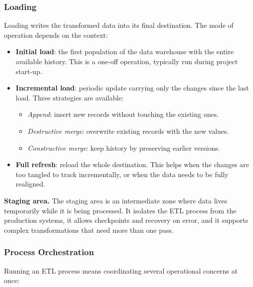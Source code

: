 \subsubsection{Loading}
\label{subsec:loading-phase}

Loading writes the transformed data into its final destination. The mode of operation depends on the context:

\begin{itemize}
    \item \textbf{Initial load}: the first population of the data warehouse with the entire available history. This is a one-off operation, typically run during project start-up.

    \item \textbf{Incremental load}: periodic update carrying only the changes since the last load. Three strategies are available:
    \begin{itemize}
        \item \textit{Append}: insert new records without touching the existing ones.
        \item \textit{Destructive merge}: overwrite existing records with the new values.
        \item \textit{Constructive merge}: keep history by preserving earlier versions.
    \end{itemize}

    \item \textbf{Full refresh}: reload the whole destination. This helps when the changes are too tangled to track incrementally, or when the data needs to be fully realigned.
\end{itemize}

\begin{notebox}
\textbf{Staging area.}
The staging area is an intermediate zone where data lives temporarily while it is being processed. It isolates the ETL process from the production systems, it allows checkpoints and recovery on error, and it supports complex transformations that need more than one pass.
\end{notebox}

\subsubsection{Process Orchestration}
\label{subsec:etl-orchestration}

Running an ETL process means coordinating several operational concerns at once:

